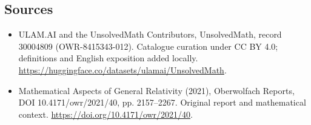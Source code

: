 \documentclass[11pt]{article}
\begin{document}
\subsection{Sources}
\begin{itemize}
\item[\hypertarget{source:30004809:1}{S1}] ULAM.AI and the UnsolvedMath Contributors, UnsolvedMath, record 30004809 (OWR-8415343-012). Catalogue curation under CC BY 4.0; definitions and English exposition added locally.
\url{https://huggingface.co/datasets/ulamai/UnsolvedMath}.
\item[\hypertarget{source:30004809:2}{S2}] Mathematical Aspects of General Relativity (2021), Oberwolfach Reports, DOI 10.4171/owr/2021/40, pp. 2157--2267. Original report and mathematical context.
\url{https://doi.org/10.4171/owr/2021/40}.
\end{itemize}
\label{end:30004809}
\end{document}
